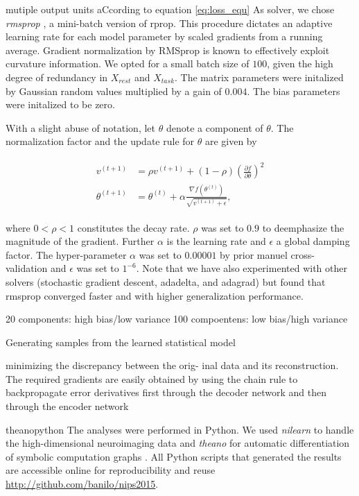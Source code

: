 \documentclass{article} %
\begin{document}
mutiple output units
aCcording to equation \eqref{eq:loss_equ}
As solver, we chose \textit{rmsprop} \cite{rmsprop},
a mini-batch version of rprop.
This procedure dictates an adaptive learning rate
for each model parameter by
scaled gradients from a running average.
Gradient normalization by RMSprop
is known to effectively exploit curvature information.
We opted for a small batch size of $100$, given the high degree of
redundancy in $X_{rest}$ and $X_{task}$.
The matrix parameters were initalized by Gaussian random values multiplied
by a gain of $0.004$. The bias parameters were initalized to be zero.

With a slight abuse of notation, let $\theta$ denote a component of $\theta$.
The normalization factor and the update rule for $\theta$
are given by

\begin{eqnarray}
  \begin{split}
v^{(t+1)} &= \rho v^{(t+1)} + (1 - \rho)\left(\frac{\partial f}{\partial \theta}\right)^2
\\
\theta^{(t+1)} &= \theta^{(t)} + \alpha \frac{\nabla f(\theta^{(t)})}{\sqrt{v^{(t+1)} + \epsilon}},
  \end{split}
\end{eqnarray}

where $0 < \rho < 1$ constitutes the decay rate. $\rho$ was set to
$0.9$ to deemphasize the magnitude of the gradient.
Further $\alpha$ is the learning rate and $\epsilon$ a global damping factor.
The hyper-parameter $\alpha$ was set to $0.00001$ by prior manuel
cross-validation and $\epsilon$ was set to $1^{-6}$.
%
Note that we have also experimented with other solvers
(stochastic gradient descent, adadelta, and adagrad) but found that
rmsprop converged faster and with higher generalization performance.

20 components: high bias/low variance
100 compoentens: low bias/high variance

Generating samples from the learned statistical model

minimizing the discrepancy between the orig- inal data and its reconstruction.
The required gradients are easily obtained by using the chain rule to
backpropagate error derivatives first through the decoder network
and then through the encoder network 

theanopython
The analyses were performed in Python.
We used \textit{nilearn} to handle
the high-dimensional neuroimaging data 
\cite{abrah14}
and
\textit{theano} for automatic
differentiation of symbolic computation graphs
\cite{bastien2012theano, bergstra2010theano}.
All Python scripts that generated the results are
accessible online for reproducibility and reuse
\url{http://github.com/banilo/nips2015}.
\end{document}
